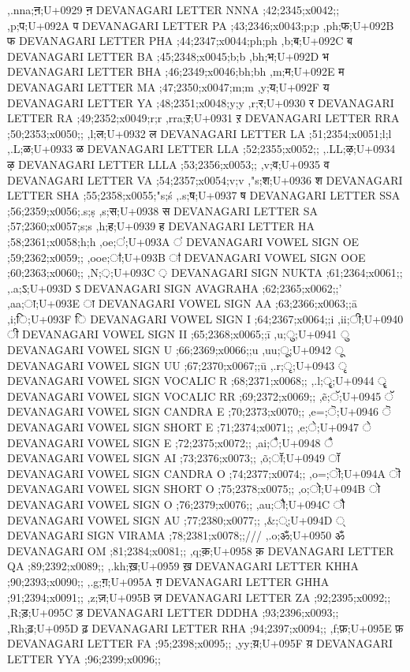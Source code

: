 \documentclass{article}
\begin{document}
{,.nna;ऩ;U+0929 ऩ DEVANAGARI LETTER NNNA ;42;2345;x0042;;
,p;प;U+092A प DEVANAGARI LETTER PA ;43;2346;x0043;p;p
,ph;फ;U+092B फ DEVANAGARI LETTER PHA ;44;2347;x0044;ph;ph
,b;ब;U+092C ब DEVANAGARI LETTER BA ;45;2348;x0045;b;b
,bh;भ;U+092D भ DEVANAGARI LETTER BHA ;46;2349;x0046;bh;bh
,m;म;U+092E म DEVANAGARI LETTER MA ;47;2350;x0047;m;m
,y;य;U+092F य DEVANAGARI LETTER YA ;48;2351;x0048;y;y
,r;र;U+0930 र DEVANAGARI LETTER RA ;49;2352;x0049;r;r
,rra;ऱ;U+0931 ऱ DEVANAGARI LETTER RRA ;50;2353;x0050;;
,l;ल;U+0932 ल DEVANAGARI LETTER LA ;51;2354;x0051;l;l
,.L;ळ;U+0933 ळ DEVANAGARI LETTER LLA ;52;2355;x0052;;
,.LL;ऴ;U+0934 ऴ DEVANAGARI LETTER LLLA ;53;2356;x0053;;
,v;व;U+0935 व DEVANAGARI LETTER VA ;54;2357;x0054;v;v
,"s;श;U+0936 श DEVANAGARI LETTER SHA ;55;2358;x0055;"s;ś
,.s;ष;U+0937 ष DEVANAGARI LETTER SSA ;56;2359;x0056;.s;ṣ
,s;स;U+0938 स DEVANAGARI LETTER SA ;57;2360;x0057;s;s
,h;ह;U+0939 ह DEVANAGARI LETTER HA ;58;2361;x0058;h;h
,oe;ऺ;U+093A ऺ DEVANAGARI VOWEL SIGN OE ;59;2362;x0059;;
,ooe;ऻ;U+093B ऻ DEVANAGARI VOWEL SIGN OOE ;60;2363;x0060;;
,N;़;U+093C ़ DEVANAGARI SIGN NUKTA ;61;2364;x0061;;
,.a;ऽ;U+093D ऽ DEVANAGARI SIGN AVAGRAHA ;62;2365;x0062;;' 
,aa;ा;U+093E ा DEVANAGARI VOWEL SIGN AA ;63;2366;x0063;;ā 
,i;ि;U+093F ि DEVANAGARI VOWEL SIGN I ;64;2367;x0064;;i 
,ii;ी;U+0940 ी DEVANAGARI VOWEL SIGN II ;65;2368;x0065;;ī 
,u;ु;U+0941 ु DEVANAGARI VOWEL SIGN U ;66;2369;x0066;;u 
,uu;ू;U+0942 ू DEVANAGARI VOWEL SIGN UU ;67;2370;x0067;;ū 
,.r;ृ;U+0943 ृ DEVANAGARI VOWEL SIGN VOCALIC R ;68;2371;x0068;;
,.l;ॄ;U+0944 ॄ DEVANAGARI VOWEL SIGN VOCALIC RR ;69;2372;x0069;;
,\~e;ॅ;U+0945 ॅ DEVANAGARI VOWEL SIGN CANDRA E ;70;2373;x0070;;
,e=;ॆ;U+0946 ॆ DEVANAGARI VOWEL SIGN SHORT E ;71;2374;x0071;;
,e;े;U+0947 े DEVANAGARI VOWEL SIGN E ;72;2375;x0072;;
,ai;ै;U+0948 ै DEVANAGARI VOWEL SIGN AI ;73;2376;x0073;;
,\~o;ॉ;U+0949 ॉ DEVANAGARI VOWEL SIGN CANDRA O ;74;2377;x0074;;
,o=;ॊ;U+094A ॊ DEVANAGARI VOWEL SIGN SHORT O ;75;2378;x0075;;
,o;ो;U+094B ो DEVANAGARI VOWEL SIGN O ;76;2379;x0076;;
,au;ौ;U+094C ौ DEVANAGARI VOWEL SIGN AU ;77;2380;x0077;;
,\&;्;U+094D ् DEVANAGARI SIGN VIRAMA ;78;2381;x0078;;///
%  
%  
,.o;ॐ;U+0950 ॐ DEVANAGARI OM ;81;2384;x0081;;
%  
%  
%  
%  
%  
%  
%  
,q;क़;U+0958 क़ DEVANAGARI LETTER QA ;89;2392;x0089;;
,.kh;ख़;U+0959 ख़ DEVANAGARI LETTER KHHA ;90;2393;x0090;;
,.g;ग़;U+095A ग़ DEVANAGARI LETTER GHHA ;91;2394;x0091;;
,z;ज़;U+095B ज़ DEVANAGARI LETTER ZA ;92;2395;x0092;;
,R;ड़;U+095C ड़ DEVANAGARI LETTER DDDHA ;93;2396;x0093;;
,Rh;ढ़;U+095D ढ़ DEVANAGARI LETTER RHA ;94;2397;x0094;;
,f;फ़;U+095E फ़ DEVANAGARI LETTER FA ;95;2398;x0095;;
,yy;य़;U+095F य़ DEVANAGARI LETTER YYA ;96;2399;x0096;;
}
\end{document}
